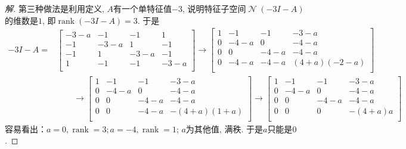 \documentclass{ctexart}
\DeclareMathOperator{\rank}{rank}
\DeclareMathOperator{\nullspace}{\mathcal{N}}
\begin{document}
\begin{proof}[解]
第三种做法是利用定义, $A$有一个单特征值$-3$, 说明特征子空间$\nullspace(-3I-A)$的维数是$1$, 即$\rank(-3I-A)=3$. 于是
\begin{align*}
    -3I-A=&
	\begin{bmatrix}
			-3-a & -1 & -1 & 1\\
			-1 & -3-a & 1 & -1\\
			-1 & 1 & -3-a & -1 \\
			 1& -1 & -1 & -3-a\\
	\end{bmatrix}
	\to\begin{bmatrix}
			 1& -1 & -1 & -3-a\\
			0 & -4-a & 0 & -4-a\\
			0 & 0 & -4-a & -4-a \\
			0 & -4-a & -4-a & %
			(4+a)(-2-a)\\
	\end{bmatrix}\\
	&\quad\quad\to\begin{bmatrix}
			 1& -1 & -1 & -3-a\\
			0 & -4-a & 0 & -4-a\\
			0 & 0 & -4-a & -4-a \\
			0 & 0 & -4-a & %
			-(4+a)(1+a)\\
	\end{bmatrix}
	\to\begin{bmatrix}
			 1& -1 & -1 & -3-a\\
			0 & -4-a & 0 & -4-a\\
			0 & 0 & -4-a & -4-a \\
			0 & 0 & 0 & %
			-(4+a)a\\
	\end{bmatrix}
\end{align*}
容易看出：$a=0,\rank=3;a=-4,\rank=1$; $a$为其他值, 满秩. 
于是$a$只能是$0$. 
\end{proof}
\end{document}

